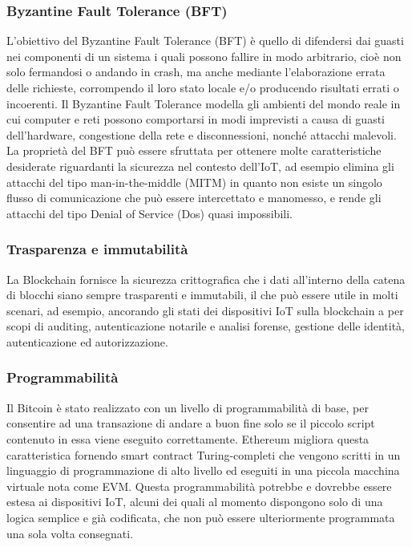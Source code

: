\subsubsection{Byzantine Fault Tolerance (BFT)}
L'obiettivo del Byzantine Fault Tolerance (BFT) è quello di difendersi dai guasti nei componenti
di un sistema i quali possono fallire in modo arbitrario, cioè non solo fermandosi o andando in crash, ma anche mediante l'elaborazione errata delle richieste, corrompendo il loro stato locale e/o producendo risultati errati o incoerenti. Il Byzantine Fault Tolerance modella gli ambienti del mondo reale in cui computer e reti possono comportarsi in modi imprevisti a causa di guasti dell'hardware, congestione della rete e disconnessioni, nonché attacchi malevoli. La proprietà del BFT può essere sfruttata per ottenere molte caratteristiche desiderate riguardanti la sicurezza nel contesto dell'IoT, ad esempio elimina gli attacchi del tipo man-in-the-middle (MITM) in quanto non esiste un singolo flusso di comunicazione che può essere intercettato e manomesso, e rende gli attacchi del tipo Denial of Service (Dos) quasi impossibili.

\subsubsection{Trasparenza e immutabilità}
La Blockchain fornisce la sicurezza crittografica che i dati all'interno della catena di blocchi siano sempre trasparenti e immutabili, il che può essere utile in molti scenari, ad esempio, ancorando gli stati dei dispositivi IoT sulla blockchain a per scopi di auditing, autenticazione notarile e analisi forense, gestione delle identità, autenticazione ed autorizzazione.

\subsubsection{Programmabilità}
Il Bitcoin è stato realizzato con un livello di programmabilità di base, per consentire ad una transazione di andare a buon fine solo se il piccolo script contenuto in essa viene eseguito correttamente. Ethereum migliora questa caratteristica
fornendo smart contract Turing-completi che vengono scritti in un linguaggio di programmazione di alto livello ed eseguiti in una piccola macchina virtuale nota come EVM. Questa programmabilità potrebbe e dovrebbe essere estesa ai dispositivi IoT, alcuni dei quali al momento dispongono solo di una logica semplice e già codificata, che non può essere ulteriormente programmata una sola volta consegnati.

